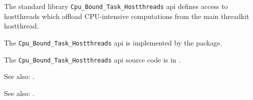 
The standard library {\tt Cpu\_Bound\_Task\_Hostthreads} api defines access to hostthreads which offload 
CPU-intensive computations from the main threadkit hostthread.

The {\tt Cpu\_Bound\_Task\_Hostthreads} api is implemented by the  package.

The {\tt Cpu\_Bound\_Task\_Hostthreads} api source code is in .

See also:   .

See also:   .
